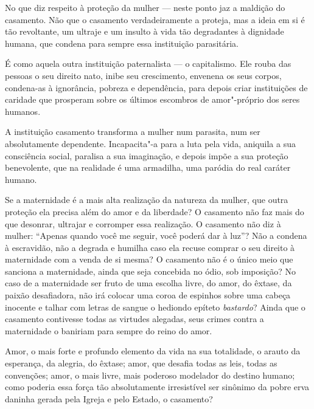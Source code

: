 No que diz respeito à proteção da mulher --- neste ponto jaz a maldição
do casamento. Não que o casamento verdadeiramente a proteja, mas a ideia
em si é tão revoltante, um ultraje e um insulto à vida tão degradantes à
dignidade humana, que condena para sempre essa instituição parasitária.

É como aquela outra instituição paternalista --- o capitalismo. Ele rouba
das pessoas o seu direito nato, inibe seu crescimento, envenena os seus
corpos, condena-as à ignorância, pobreza e dependência, para depois
criar instituições de caridade que prosperam sobre os últimos escombros de
amor"-próprio dos seres humanos.

A instituição casamento transforma a mulher num parasita, num ser
absolutamente dependente. Incapacita"-a para a luta pela vida, aniquila a
sua consciência social, paralisa a sua imaginação, e depois impõe a sua
proteção benevolente, que na realidade é uma armadilha, uma paródia do
real caráter humano.\label{parasita}

Se a maternidade é a mais alta realização da natureza da mulher, que
outra proteção ela precisa além do amor e da liberdade? O casamento não
faz mais do que desonrar, ultrajar e corromper essa realização. O
casamento não diz à mulher: ``Apenas quando você me seguir, você poderá
dar à luz''? Não a condena à escravidão, não a degrada e humilha caso
ela recuse comprar o seu direito à maternidade com a venda de si mesma?
O casamento não é o único meio que sanciona a maternidade, ainda que
seja concebida no ódio, sob imposição? No caso de a maternidade ser
fruto de uma escolha livre, do amor, do êxtase, da paixão desafiadora,
não irá colocar uma coroa de espinhos sobre uma cabeça inocente e talhar
com letras de sangue o hediondo epíteto \textit{bastardo}? Ainda que o
casamento contivesse todas as virtudes alegadas, seus crimes contra a
maternidade o baniriam para sempre do reino do amor.

Amor, o mais forte e profundo elemento da vida na sua totalidade, o arauto da
esperança, da alegria, do êxtase; amor, que desafia todas as leis, todas
as convenções; amor, o mais livre, mais poderoso modelador do destino
humano; como poderia essa força tão absolutamente irresistível ser sinônimo
da pobre erva daninha gerada pela Igreja e pelo Estado, o casamento?

